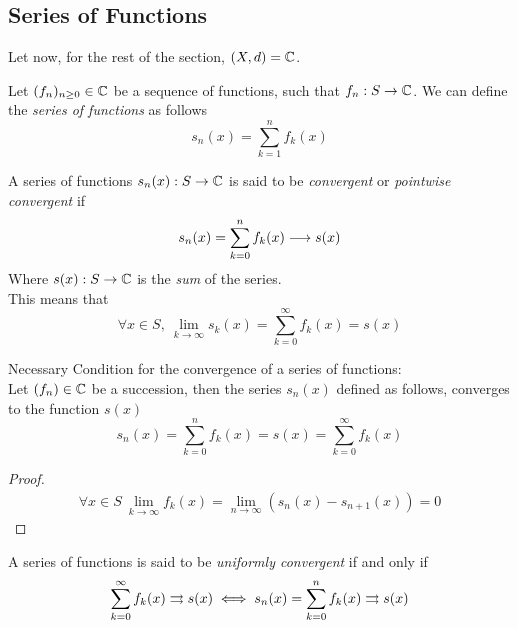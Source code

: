 \documentclass[../complete.tex]{subfiles}
\begin{document}
\subsection{Series of Functions}
Let now, for the rest of the section, $(X,d)=\mathbb{C}$.
\begin{dfn}
	Let $(f_n)_{n\ge0}\in\mathbb{C}$ be a sequence of functions, such that $f_n:S\to\mathbb{C}$. We can define the \textit{series of functions} as follows
	\begin{equation}
		s_n(x)=\sum_{k=1}^nf_k(x)
		\label{eq:seriesdef}
	\end{equation}
\end{dfn}
\begin{dfn}
	A series of functions $s_n(x):S\to\mathbb{C}$ is said to be \textit{convergent} or \textit{pointwise convergent} if
	\begin{equation}
		s_n(x)=\sum_{k=0}^nf_k(x)\overset{}{\longrightarrow} s(x)
		\label{eq:serconv}
	\end{equation}
	Where $s(x):S\to\mathbb{C}$ is the \textit{sum} of the series.\\
	This means that
	\begin{equation}
		\forall x\in S,\ \lim_{k\to\infty}s_k(x)=\sum_{k=0}^\infty f_k(x)=s(x)
	\end{equation}
\end{dfn}
\begin{thm}
	Necessary Condition for the convergence of a series of functions:\\
	Let $(f_n)\in\mathbb{C}$ be a succession, then the series $s_n(x)$ defined as follows, converges to the function $s(x)$
	\begin{equation*}
		s_n(x)=\sum_{k=0}^nf_k(x)=s(x)=\sum_{k=0}^\infty f_k(x)
	\end{equation*}
\end{thm}
\begin{proof}
	\begin{equation*}
		\begin{aligned}
			\forall x\in S\ \lim_{k\to\infty}f_k(x)=\lim_{n\to\infty}\left( s_n(x)-s_{n+1}(x) \right)=0
		\end{aligned}
	\end{equation*}
\end{proof}
\begin{dfn}
	A series of functions is said to be \textit{uniformly convergent} if and only if
	\begin{equation}
		\sum_{k=0}^\infty f_k(x)\rightrightarrows s(x)\iff s_n(x)=\sum_{k=0}^nf_k(x)\rightrightarrows s(x)
		\label{eq:uniformconvser}
	\end{equation}
\end{dfn}
\end{document}

